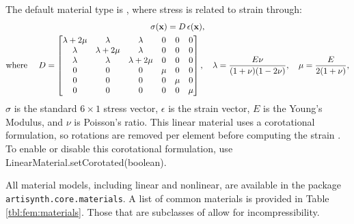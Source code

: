 The default material type is
, where stress is
related to strain through:
\begin{gather}
  \sigma({\bf x}) = D\,\epsilon({\bf x}), \label{eqn:fem:mat:linear}\\
  \text{where }\quad D = \begin{bmatrix}
	  \lambda +2\mu & \lambda & \lambda  & 0 & 0 & 0\\
	  \lambda &  \lambda +2\mu & \lambda & 0 & 0 & 0\\
	  \lambda & \lambda & \lambda +2\mu & 0 & 0 & 0\\
	  0 & 0 & 0 & \mu & 0 & 0\\
	  0 & 0 & 0 & 0 & \mu & 0\\
	  0 & 0 & 0 & 0 & 0 & \mu
        \end{bmatrix}, \quad \lambda = \dfrac{E\nu}{(1+\nu)(1-2\nu)},  \quad
      \mu = \dfrac{E}{2(1+\nu)},\notag
\end{gather}
$\sigma$ is the standard $6\times 1$ stress vector, $\epsilon$ is the 
strain vector, $E$ is the Young's Modulus, and $\nu$ is Poisson's ratio. This
linear material uses a corotational formulation, so rotations are removed
per element before computing the strain \cite{ngan:fem:2008}.  To enable or
disable this corotational formulation, use 
%
{LinearMaterial.setCorotated(boolean)}.

All material models, including linear and nonlinear, are available in the package  
{\tt artisynth.core.materials}.  A list of common materials is provided in 
Table \ref{tbl:fem:materials}.  Those that are subclasses of 
 allow for 
incompressibility.

